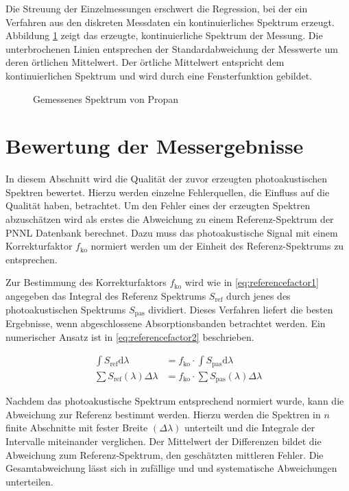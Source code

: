 Die Streuung der Einzelmessungen erschwert die Regression, bei der ein Verfahren aus den diskreten Messdaten ein kontinuierliches Spektrum erzeugt.
Abbildung \ref{fig:PropanSpectra} zeigt das erzeugte, kontinuierliche Spektrum der Messung.
Die unterbrochenen Linien entsprechen der Standardabweichung der Messwerte um deren örtlichen Mittelwert.
Der örtliche Mittelwert entspricht dem kontinuierlichen Spektrum und wird durch eine Fensterfunktion gebildet.
\begin{figure}[htb]
    \centering
    
    \caption{Gemessenes Spektrum von Propan}
    \label{fig:PropanSpectra}
\end{figure}

\section{Bewertung der Messergebnisse}
In diesem Abschnitt wird die Qualität der zuvor erzeugten photoakustischen Spektren bewertet.
Hierzu werden einzelne Fehlerquellen, die Einfluss auf die Qualität haben, betrachtet.
Um den Fehler eines der erzeugten Spektren abzuschätzen wird als erstes die Abweichung zu einem  Referenz-Spektrum der \gls{PNNL} Datenbank berechnet.
Dazu muss das photoakustische Signal mit einem Korrekturfaktor $f_\mathrm{ko}$ normiert werden um der Einheit des Referenz-Spektrums zu entsprechen.

Zur Bestimmung des Korrekturfaktors $f_\mathrm{ko}$ wird wie in \cref{eq:referencefactor1} angegeben das Integral des Referenz Spektrums $S_\mathrm{ref}$ durch jenes des photoakustischen Spektrums $S_\mathrm{pas}$ dividiert.
Dieses Verfahren liefert die besten Ergebnisse, wenn abgeschlossene Absorptionsbanden betrachtet werden.
Ein numerischer Ansatz ist in \cref{eq:referencefactor2} beschrieben.

\begin{subequations} 
    \begin{align}
        \int S_\mathrm{ref}\mathrm{d}\lambda &= f_\mathrm{ko} \cdot \int S_\mathrm{pas}\mathrm{d}\lambda \label{eq:referencefactor1} \\
        \sum S_\mathrm{ref}(\lambda)\Delta\lambda &= f_\mathrm{ko} \cdot \sum S_\mathrm{pas}(\lambda)\Delta\lambda \label{eq:referencefactor2}
    \end{align}
\end{subequations}

Nachdem das photoakustische Spektrum entsprechend normiert wurde, kann die Abweichung zur Referenz bestimmt werden.
Hierzu werden die Spektren in $n$ finite Abschnitte mit fester Breite $(\Delta \lambda)$ unterteilt und die Integrale der Intervalle miteinander verglichen.
Der Mittelwert der Differenzen bildet die Abweichung zum Referenz-Spektrum, den geschätzten mittleren Fehler.
Die Gesamtabweichung lässt sich in zufällige und und systematische Abweichungen unterteilen.

